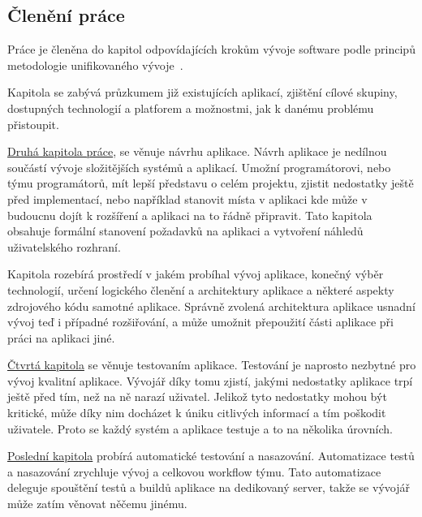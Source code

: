 \begin{introduction}
    \section{Členění práce}
    Práce je členěna do kapitol odpovídajících krokům vývoje software podle principů metodologie unifikovaného vývoje~\cite[s.~51‑68]{arlow_2007_uml}.

    Kapitola  se zabývá průzkumem již existujících aplikací, zjištění cílové skupiny, dostupných technologií a platforem a možnostmi, jak k danému problému přistoupit.

    \hyperref[ch:design]{Druhá kapitola práce}, se věnuje návrhu aplikace. Návrh aplikace je nedílnou součástí vývoje složitějších systémů a aplikací. Umožní programátorovi, nebo týmu programátorů, mít lepší představu o celém projektu, zjistit nedostatky ještě před implementací, nebo například stanovit místa v aplikaci kde může v budoucnu dojít k rozšíření a aplikaci na to řádně připravit. Tato kapitola obsahuje formální stanovení požadavků na aplikaci a vytvoření náhledů uživatelského rozhraní.

    Kapitola  rozebírá prostředí v jakém probíhal vývoj aplikace, konečný výběr technologií, určení logického členění a architektury aplikace a některé aspekty zdrojového kódu samotné aplikace. Správně zvolená architektura aplikace usnadní vývoj teď i případné rozšiřování, a může umožnit přepoužití části aplikace při práci na aplikaci jiné.

    \hyperref[ch:testing]{Čtvrtá kapitola} se věnuje testovaním aplikace. Testování je naprosto nezbytné pro vývoj kvalitní aplikace. Vývojář díky tomu zjistí, jakými nedostatky aplikace trpí ještě před tím, než na ně narazí uživatel. Jelikož tyto nedostatky mohou být kritické, může díky nim docházet k úniku citlivých informací a tím poškodit uživatele. Proto se každý systém a aplikace testuje a to na několika úrovních.

    \hyperref[ch:ci_cd]{Poslední kapitola} probírá automatické testování a nasazování. Automatizace testů a nasazování zrychluje vývoj a celkovou workflow týmu. Tato automatizace deleguje spouštění testů a buildů aplikace na dedikovaný server, takže se vývojář může zatím věnovat něčemu jinému.
\end{introduction}